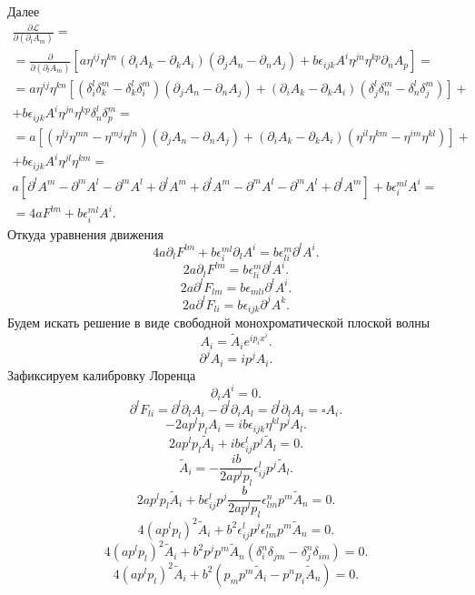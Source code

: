 \documentclass[a4paper]{article}
\begin{document}
Далее
\begin{multline*}
	\frac{\partial \mathcal{L}}{\partial (\partial_l A_m)} =\\=
	\frac{\partial}{\partial(\partial_l A_m)}\left[a
	\eta^{ij}\eta^{kn}(\partial_i A_k-\partial_k A_i)(
\partial_j A_n -\partial_n A_j)+b \epsilon_{ijk} A^i
\eta^{jn}\eta^{kp}\partial_n A_p \right] =\\=
a\eta^{ij}\eta^{kn}[(\delta^l_i \delta^m_k-\delta^l_k\delta^m_i)
(\partial_j A_n -\partial_n A_j)+(\partial_i A_k-\partial_k A_i)
(\delta^l_j \delta^m_n-\delta^l_n\delta_j^m)]+\\+
b\epsilon_{ijk}A^i \eta^{jn}\eta^{kp}\delta^l_n\delta^m_p=\\=
a\left[(\eta^{lj}\eta^{mn}-\eta^{mj}\eta^{ln})(\partial_j A_n-
\partial_n A_j)+(\partial_i A_k -\partial_k A_i)(\eta^{il}\eta^{km}-
\eta^{im}\eta^{kl})\right]+\\+b \epsilon_{ijk}A^i\eta^{jl}\eta^{km}=\\
a \left[ \partial^l A^m-\partial^m A^l-\partial^mA^l+\partial^l
A^m+\partial^l A^m-\partial^mA^l-\partial^mA^l+\partial^lA^m\right] +b \epsilon^{ml}_i A^i=\\=
4aF^{lm}+b\epsilon_i^{ml}A^i
.\end{multline*} 
Откуда уравнения движения
\[
4a \partial_l F^{lm}+b\epsilon_i^{ml}\partial_l A^i=b \epsilon_{li}^m \partial^l A^i
.\] 
\[
2a \partial_l F^{lm}=b \epsilon^m_{li}\partial^lA^i
.\] 
\[
2a \partial^l F_{lm}=b \epsilon_{mli}\partial^l A^i
.\] 
\[
2a \partial^l F_{li}=b \epsilon_{ijk}\partial^j A^k
.\]
Будем искать решение в виде свободной монохроматической
плоской волны
\[
	A_i=\tilde{A}_i e^{i p_i x^i}
.\] 
\[
\partial^j A_i=
	ip^j A_i
.\] 
Зафиксируем калибровку Лоренца
\[
\partial_i A^i=0
.\] 
\[
\partial^l F_{li}=\partial^l \partial_l A_i -\partial^l \partial_i
A_l=\partial^l \partial_l A_i=\square A_i
.\] 
\[
	-2a p^lp_lA_i 
	=ib \epsilon_{ijk}\eta^{kl}p^jA_l
.\] 
\[
	2a p^lp_l\tilde{A}_i 
	+ib \epsilon_{ij}^lp^j\tilde{A}_l=0
.\]
\[
	\tilde{A}_i=-\frac{ib}{2ap^lp_l}\epsilon^l_{ij}p^j
	\tilde{A}_l
.\] 
\[
	2ap^lp_l \tilde{A}_i+b \epsilon^l_{ij}p^j
	\frac{b}{2ap^l p_l}\epsilon^n_{lm}p^m\tilde{A}_n=0
.\]
\[
	4(ap^lp_l)^2\tilde{A}_i +b^2 \epsilon^l_{ij}p^j
	\epsilon^n_{lm}p^m\tilde{A}_n=0
.\]
\[
	4(ap^lp_l)^2\tilde{A}_i +b^2 p^j
	p^m\tilde{A}_n\left( \delta^n_i \delta_{jm}-\delta^n_j \delta_{im}\right) =0
.\]
\[
	4(ap^lp_l)^2\tilde{A}_i +b^2\left( p_m
	p^m\tilde{A}_i-p^n p_i \tilde{A}_n\right) =0
.\]
\end{document}
